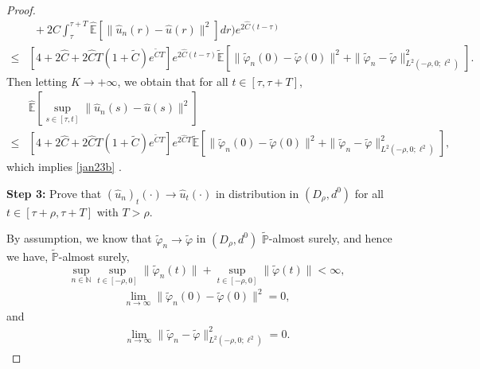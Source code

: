 \documentclass[10pt,a4paper]{amsart}
\begin{document}
\begin{proof}
\begin{align*}
      & \  \
                 + 2 \hat{C} \int_{\tau}^{\tau + T}
                    \widehat{\mathbb{E}}
                         \left[ \|\hat{u}_n(r) - \hat{u}(r)\|^2 \right] dr
           \bigg) e^{2 \hat{C}(t-\tau)} \nonumber\\
 \le & \left[ 4 + 2 \hat{C} 
                       + 2 \widehat{C} T(1 + \widetilde{C} ) e^{\widetilde{C} T}
           \right] 
           e^{2 \hat{C}(t-\tau)}
             \widetilde{\mathbb{E}} 
                  \left[ \| {\widetilde{\varphi}}_n(0) - \widetilde{\varphi}(0) \|^2  
                            + \| {\widetilde{\varphi}}_n - \widetilde{\varphi} \|^2_{L^2(-\rho, 0; \ell^2)}     
                  \right].
 \end{align*}
 Then letting $K \to +\infty$, we obtain that for all $t \in [\tau, \tau+T]$,
 \begin{align*}
      & \widehat{\mathbb{E}}
             \left[ \sup_{s \in [\tau, t]}
                            \| \hat{u}_n(s) - \hat{u}(s) \|^2
             \right] \\
\le & \left[ 4 + 2 \hat{C} 
                     + 2 \widehat{C} T(1 + \widetilde{C} ) e^{\widetilde{C} T}
           \right] 
           e^{2 \hat{C}T}
           \widetilde{\mathbb{E}} 
                \left[ \| {\widetilde{\varphi}}_n(0) - \widetilde{\varphi}(0) \|^2  
                         + \| {\widetilde{\varphi}}_n - \widetilde{\varphi} \|^2_{L^2(-\rho, 0; \ell^2)}     
                \right],
 \end{align*}
 which implies 
 \eqref{jan23b} .
  
 
 {\bf Step 3:} Prove that $ (\hat{u}_{n})_t(\cdot) \to \hat{u}_{t}(\cdot) $ in distribution in $(D_{\rho}, d^0)$ for 
 all $ t \in [\tau+ {{} \rho}, \tau+T]$ with
  {{}$T > \rho$.}
  
 By assumption, we know that
 $ {\widetilde{\varphi} }_n \to  \widetilde{\varphi}$ in $(D_\rho, d^0)$ 
 $\widetilde{\mathbb{P}}$-almost surely,
 and hence we have,
 $\widetilde{\mathbb{P}}$-almost surely,
 $$ \sup_{n \in \mathbb{N}}
            \sup_{t \in [-\rho,0]}
                 \| {\widetilde{\varphi}}_n (t) \|
      + \sup_{t\in [-\rho,0]}
              \| \widetilde{\varphi }(t) \|
     < \infty,
$$
\begin{align} \label{jan23d}
 \lim_{n \to \infty}
     \| {\widetilde{\varphi} }_n  (0) - \widetilde{\varphi} (0)\|^2 = 0,
\end{align}
and
\begin{align} \label{jan23e}
 \lim_{n \to \infty}
      \| {\widetilde{\varphi}}_n - \widetilde{\varphi} \|^2_{L^2(-\rho, 0; \ell^2)}
  = 0.
\end{align}


\end{proof}
\end{document}
